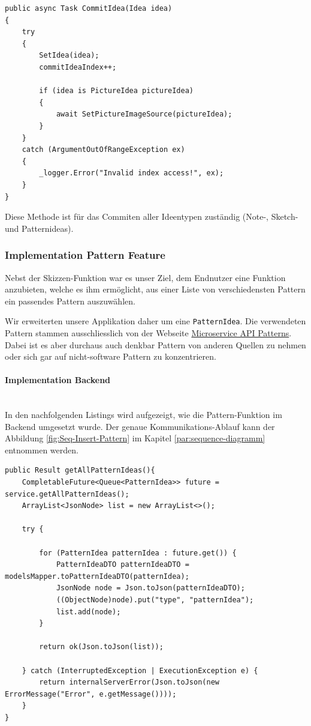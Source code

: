 \begin{lstlisting}[caption={Commit-Idea Methode auf dem BrainstormingService}, label={commit-idea}]
public async Task CommitIdea(Idea idea)
{
	try
	{
		SetIdea(idea);
		commitIdeaIndex++;
		
		if (idea is PictureIdea pictureIdea)
		{
			await SetPictureImageSource(pictureIdea);
		}
	}
	catch (ArgumentOutOfRangeException ex)
	{
		_logger.Error("Invalid index access!", ex);
	}
}
\end{lstlisting}

Diese Methode ist für das Commiten aller Ideentypen zuständig (Note-, Sketch- und Patternideas). 

\subsubsection{Implementation Pattern Feature}
Nebst der Skizzen-Funktion war es unser Ziel, dem Endnutzer eine Funktion anzubieten, welche es ihm ermöglicht, aus einer Liste von verschiedensten Pattern ein passendes Pattern auszuwählen. 

Wir erweiterten unsere Applikation daher um eine \texttt{PatternIdea}. Die verwendeten Pattern stammen ausschliesslich von der Webseite \href{https://microservice-api-patterns.org}{Microservice API Patterns}. Dabei ist es aber durchaus auch denkbar Pattern von anderen Quellen zu nehmen oder sich gar auf nicht-software Pattern zu konzentrieren.

\paragraph*{Implementation Backend}~\\
In den nachfolgenden Listings wird aufgezeigt, wie die Pattern-Funktion im Backend umgesetzt wurde.
Der genaue Kommunikations-Ablauf kann der Abbildung \ref{fig:Seq-Insert-Pattern} im Kapitel \ref{par:sequence-diagramm} entnommen werden.

\begin{lstlisting}[caption={Alle Pattern holen im Pattern Controller}, label=getAllPatternInController]
 public Result getAllPatternIdeas(){
    CompletableFuture<Queue<PatternIdea>> future = service.getAllPatternIdeas();
    ArrayList<JsonNode> list = new ArrayList<>();

    try {

        for (PatternIdea patternIdea : future.get()) {
            PatternIdeaDTO patternIdeaDTO = modelsMapper.toPatternIdeaDTO(patternIdea);
            JsonNode node = Json.toJson(patternIdeaDTO);
            ((ObjectNode)node).put("type", "patternIdea");
            list.add(node);
        }

        return ok(Json.toJson(list));

    } catch (InterruptedException | ExecutionException e) {
        return internalServerError(Json.toJson(new ErrorMessage("Error", e.getMessage())));
    }
}
\end{lstlisting}

